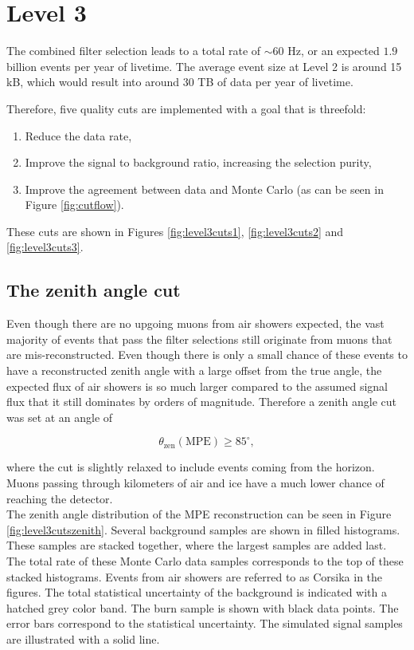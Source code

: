 \section{Level 3}
The combined filter selection leads to a total rate of $\sim60$ Hz, or an expected $1.9$ billion events per year of livetime. The average event size at Level 2 is around 15 kB, which would result into around 30 TB of data per year of livetime.

Therefore, five quality cuts are implemented with a goal that is threefold:
\vspace{2mm}
\begin{enumerate}
\item Reduce the data rate,
\item Improve the signal to background ratio, increasing the selection purity,
\item Improve the agreement between data and Monte Carlo (as can be seen in Figure \ref{fig:cutflow}).
\end{enumerate}
\vspace{2mm}
\noindent These cuts are shown in Figures \ref{fig:level3cuts1}, \ref{fig:level3cuts2} and \ref{fig:level3cuts3}.


\subsection{The zenith angle cut}
\label{subsec:zenithanglecut}
Even though there are no upgoing muons from air showers expected, the vast majority of events that pass the filter selections still originate from muons that are mis-reconstructed. Even though there is only a small chance of these events to have a reconstructed zenith angle with a large offset from the true angle, the expected flux of air showers is so much larger compared to the assumed signal flux that it still dominates by orders of magnitude. Therefore a zenith angle cut was set at an angle of 

\begin{equation}
\theta_\textrm{zen} (\textrm{MPE}) \geq 85^\circ,
\end{equation}

\noindent where the cut is slightly relaxed to include events coming from the horizon. Muons passing through kilometers of air and ice have a much lower chance of reaching the detector.\\

\noindent The zenith angle distribution of the MPE reconstruction can be seen in Figure \ref{fig:level3cutszenith}. Several background samples are shown in filled histograms. These samples are stacked together, where the largest samples are added last. The total rate of these Monte Carlo data samples corresponds to the top of these stacked histograms. Events from air showers are referred to as Corsika in the figures. The total statistical uncertainty of the background is indicated with a hatched grey color band. The burn sample is shown with black data points. The error bars correspond to the statistical uncertainty. The simulated signal samples are illustrated with a solid line.


